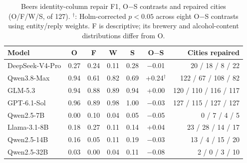 \begin{table}[t]
  \caption{Beers identity-column repair F1, O$-$S contrasts and repaired cities (O/F/W/S, of 127). $^\dagger$: Holm-corrected $p<0.05$ across eight O$-$S contrasts using entity/reply weights. F is descriptive; its brewery and alcohol-content distributions differ from O.}
  \label{tab:beers}
  \small
  \setlength{\tabcolsep}{3.5pt}
  \begin{tabular*}{\columnwidth}{@{\extracolsep{\fill}}lcccccr@{}}
    \toprule
    Model & O & F & W & S & O$-$S & Cities repaired \\
    \midrule
    DeepSeek-V4-Pro & 0.27 & 0.24 & 0.11 & 0.28 & $-$0.01 & 20 / 18 / 8 / 22 \\
    Qwen3.8-Max & 0.94 & 0.61 & 0.82 & 0.69 & +0.24$^\dagger$ & 122 / 67 / 108 / 82 \\
    GLM-5.3 & 0.94 & 0.88 & 0.89 & 0.94 & +0.00 & 120 / 110 / 116 / 117 \\
    GPT-6.1-Sol & 0.96 & 0.89 & 0.98 & 1.00 & $-$0.03 & 127 / 115 / 127 / 127 \\
    Qwen2.5-7B & 0.00 & 0.10 & 0.04 & 0.05 & $-$0.05 & 0 / 7 / 4 / 5 \\
    Llama-3.1-8B & 0.18 & 0.27 & 0.11 & 0.14 & +0.04 & 23 / 28 / 14 / 17 \\
    Qwen2.5-14B & 0.16 & 0.05 & 0.11 & 0.19 & $-$0.03 & 13 / 4 / 15 / 20 \\
    Qwen2.5-32B & 0.03 & 0.00 & 0.04 & 0.11 & $-$0.08 & 2 / 0 / 3 / 10 \\
    \bottomrule
  \end{tabular*}
\end{table}
